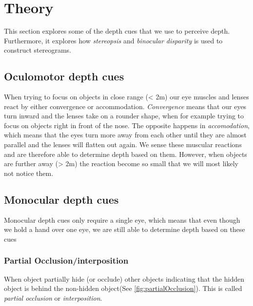 \section{Theory}
This section explores some of the depth cues that we use to perceive depth. Furthermore, it explores how \textit{stereopsis} and \textit{binocular disparity} is used to construct stereograms.

\subsection{Oculomotor depth cues}
When trying to focus on objects in close range (< 2m) our eye muscles and lenses react by either convergence or accommodation. \textit{Convergence} means that our eyes turn inward and the lenses take on a rounder shape, when for example trying to focus on objects right in front of the nose. The opposite happens in \textit{accomodation}, which means that the eyes turn more away from each other until they are almost parallel and the lenses will flatten out again. We sense these muscular reactions and are therefore able to determine depth based on them. However, when objects are further away (> 2m) the reaction become so small that we will most likely not notice them\citep[p.~196]{sensationPerception}.

\subsection{Monocular depth cues}
Monocular depth cues only require a single eye, which means that even though we hold a hand over one eye, we are still able to determine depth based on these cues\citep[p.~197]{sensationPerception}

\subsubsection{Partial Occlusion/interposition}
When object partially hide (or occlude) other objects indicating that the hidden object is behind the non-hidden object(See \autoref{fig:partialOcclusion}). This is called \textit{partial occlusion} or \textit{interposition}\citep[p.~197]{sensationPerception}.

